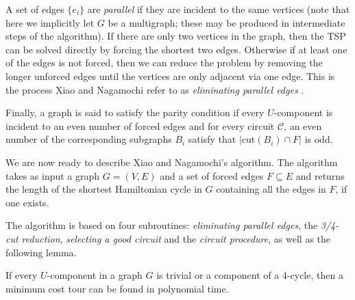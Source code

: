 A set of edges $\{e_i\}$ are {\em parallel} if they are incident to the same vertices (note that here we implicitly let $G$ be a multigraph; these may be produced in intermediate steps of the algorithm). If there are only two vertices in the graph, then the TSP can be solved directly by forcing the shortest two edges. Otherwise if at least one of the edges is not forced, then we can reduce the problem by removing the longer unforced edges until the vertices are only adjacent via one edge. This is the process Xiao and Nagamochi refer to as {\em eliminating parallel edges} \cite{xiao2016degree3}.

Finally, a graph is said to satisfy the parity condition if every $U$-component is incident to an even number of forced edges and for every circuit $\mathcal{C}$, an even number of the corresponding subgraphs $B_i$ satisfy that $|\text{cut}(B_i) \cap F|$ is odd.




We are now ready to describe Xiao and Nagamochi's algorithm. The algorithm takes as input a graph $G = (V, E)$ and a set of forced edges $F \subseteq E$ and returns the length of the shortest Hamiltonian cycle in $G$ containing all the edges in $F$, if one exists.

The algorithm is based on four subroutines: {\em eliminating parallel edges}, the {\em 3/4-cut reduction}, {\em selecting a good circuit} and the {\em circuit procedure}, as well as the following lemma.

\begin{lemma}
\label{lem:trivial}
If every $U$-component in a graph $G$ is trivial or a component of a 4-cycle, then a minimum cost tour can be found in polynomial time.
\end{lemma}

